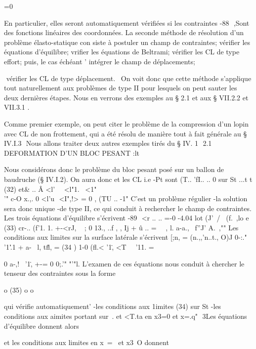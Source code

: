 {{{=0 

En particulier, elles seront automatiquement vérifiées si les contraintes 
-88 ­
,Sont des fonctions linéaires des coordonnées. 
La seconde méthode de résolution d'un problème élasto-statique con­
siste à postuler un champ de contraintes; vérifier les équations d'équilibre; vrifier les équations de Beltrami; vérifier les CL de type effort; 
puis, le cas échéant 
' intégrer le champ de déplacements; 

 vérifier les CL de type déplacement.
\ On voit donc que cette méthode s'applique tout naturellement aux problèmes de type II pour lesquels on peut sauter les deux dernières étapes. Nous en verrons des exemples au § 2.1 et aux § VII.2.2 et VII.3.1 . 

Comme premier exemple, on peut citer le problème de la compression d'un lopin avec CL de non frottement, qui a été résolu de manière tout à fait générale au § IV.I.3  Nous allons traiter deux autres exemples tirés du § IV. 1  
2.1 DEFORMATION D'UN BLOC PESANT 
:lt~ 


Nous considérons donc le problème du bloc pesant posé sur un ballon de baudruche (§ IV.I.2). On aura donc et les CL
i.e -Pt 
sont 
(T.. 'fI.. .. 0 sur 
St
...t t 
(32) 
et& .. Â <l'~\  <l"1.~ <1"\\
'" c-O x.,. 0 <l'u  <I",!> = 0 , (TU .. -1" 
C'est un problème régulier -la solution sera donc unique -de type II, ce qui conduit à rechercher le champ de contraintes. Les trois équations d'équi­libre s'écrivent 
-89 ­
<r .. .. =-0 
-4.04 lot (J'~/~ (f.~,lo 
e
(33) 
cr-.. (f'1. 1. +-<rJ, ~ ; 0
13., ..f , , Ij + û .. = 
~~, l. a-a.,~ f''J'
A.~,"" 
Les conditions aux limites sur la surface latérale s'écrivent [;n, = (n.,,'n..t., O)J 
0-:." '1'\..1 + a-~ l, tf\.l, = 
(34 ) 1-0
(fl.< '1\., <T~~ '1\.1. =
{ 0 
a-,!~ '1\., +-= 0
0;.'" "'"l. L'examen de ces équations nous conduit à chercher le tenseur des contraintes sous la forme 

o 
(35) 
o o 

qui vérifie automatiquement' -les conditions aux 1imites (34) sur St -les conditions aux aimites portant sur~. et <T.ta en x3=0 et x=.q" 
3Les équations d'équilibre donnent alors 

et les conditions aux limites en x~=~ et x3~O donnent 

}}}}

